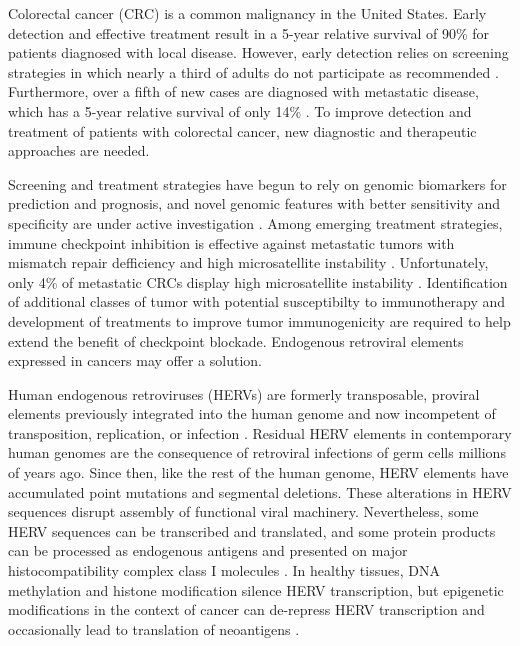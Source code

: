Colorectal cancer (CRC) is a common malignancy in the United States.
Early detection and effective treatment result in a 5-year relative survival of 90\% for patients diagnosed with local disease.
However, early detection relies on screening strategies in which nearly a third of adults do not participate as recommended \citep{CDC2019}.
Furthermore, over a fifth of new cases are diagnosed with metastatic disease, which has a 5-year relative survival of only 14\% \citep{SEER2020}.
To improve detection and treatment of patients with colorectal cancer, new diagnostic and therapeutic approaches are needed.

Screening and treatment strategies have begun to rely on genomic biomarkers for prediction and prognosis, and novel genomic features with better sensitivity and specificity are under active investigation \citep{Imperiale2014, Sveen2020}.
Among emerging treatment strategies, immune checkpoint inhibition is effective against metastatic tumors with mismatch repair defficiency and high microsatellite instability \citep{Le2015, Overman2018}.
Unfortunately, only 4\% of metastatic CRCs display high microsatellite instability \citep{Ganesh2019}.
Identification of additional classes of tumor with potential susceptibilty to immunotherapy and development of treatments to improve tumor immunogenicity are required to help extend the benefit of checkpoint blockade.
Endogenous retroviral elements expressed in cancers may offer a solution.

Human endogenous retroviruses (HERVs) are formerly transposable, proviral elements previously integrated into the human genome and now incompetent of transposition, replication, or infection \citep{Babaian2016}.
Residual HERV elements in contemporary human genomes are the consequence of retroviral infections of germ cells millions of years ago.
Since then, like the rest of the human genome, HERV elements have accumulated point mutations and segmental deletions.
These alterations in HERV sequences disrupt assembly of functional viral machinery.
Nevertheless, some HERV sequences can be transcribed and translated, and some protein products can be processed as endogenous antigens and presented on major histocompatibility complex class I molecules \citep{Boller1997, Mullins2012, Rooney2015}.
In healthy tissues, DNA methylation and histone modification silence HERV transcription, but epigenetic modifications in the context of cancer can de-repress HERV transcription and occasionally lead to translation of neoantigens \citep{Babaian2016, Menendez2004, Wiesner2015}.

